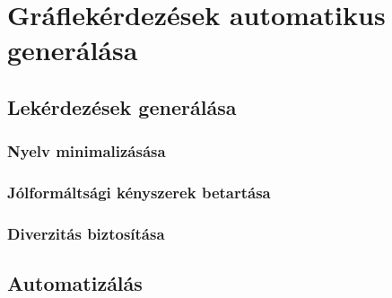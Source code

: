\chapter{Gráflekérdezések automatikus generálása}
\section{Lekérdezések generálása}

\subsection{Nyelv minimalizásása}
\subsection{Jólformáltsági kényszerek betartása}
\subsection{Diverzitás biztosítása}


\section{Automatizálás}


